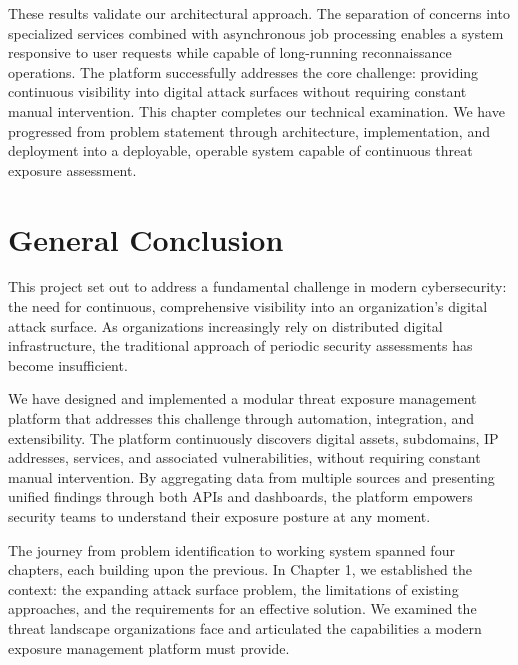 \documentclass[a4paper,12pt]{report}
\begin{document}
These results validate our architectural approach. The separation of concerns into specialized services combined with asynchronous job processing enables a system responsive to user requests while capable of long-running reconnaissance operations. The platform successfully addresses the core challenge: providing continuous visibility into digital attack surfaces without requiring constant manual intervention. This chapter completes our technical examination. We have progressed from problem statement through architecture, implementation, and deployment into a deployable, operable system capable of continuous threat exposure assessment.\hfill \break




\newpage
\thispagestyle{plain}
\section*{General Conclusion}
\label{chapter:General Conclusion}

This project set out to address a fundamental challenge in modern cybersecurity: the need for continuous, comprehensive visibility into an organization's digital attack surface. As organizations increasingly rely on distributed digital infrastructure, the traditional approach of periodic security assessments has become insufficient.\hfill \break

We have designed and implemented a modular threat exposure management platform that addresses this challenge through automation, integration, and extensibility. The platform continuously discovers digital assets, subdomains, IP addresses, services, and associated vulnerabilities, without requiring constant manual intervention. By aggregating data from multiple sources and presenting unified findings through both APIs and dashboards, the platform empowers security teams to understand their exposure posture at any moment.\hfill \break

The journey from problem identification to working system spanned four chapters, each building upon the previous. In Chapter 1, we established the context: the expanding attack surface problem, the limitations of existing approaches, and the requirements for an effective solution. We examined the threat landscape organizations face and articulated the capabilities a modern exposure management platform must provide.\hfill \break
\end{document}
